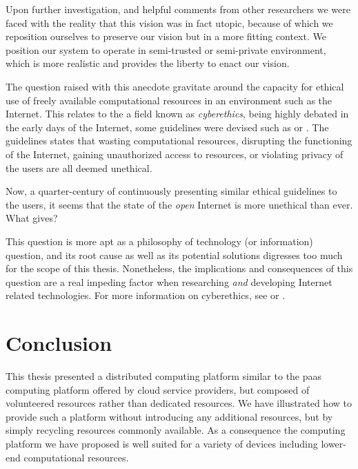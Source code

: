 \documentclass[12pt, titlepage]{uo_temp}
\begin{document}
     Upon further investigation, and helpful comments from other researchers we were faced
     with the reality that this vision was in fact utopic, because of which we reposition
     ourselves to preserve our vision but in a more fitting context. We position
     our system to operate in semi-trusted or semi-private environment, which is more
     realistic and provides the liberty to enact our vision. 
     
     The question raised with this anecdote gravitate around the capacity for ethical use
     of freely available computational resources in an environment such as the
     Internet. This relates to the a field known as \emph{cyberethics}, being highly
     debated in the early days of the Internet, some guidelines were devised such as
     \cite{ethics1989rfc} or \cite{barquin1992pursuit}. The guidelines states that wasting
     computational resources, disrupting the functioning of the Internet, gaining
     unauthorized access to resources, or violating privacy of the users are all deemed
     unethical.

     Now, a quarter-century of continuously presenting similar ethical guidelines to the
     users, it seems that the state of the \emph{open} Internet is more unethical than
     ever. What gives?

     This question is more apt as a philosophy of technology (or information) question,
     and its root cause as well as its potential solutions digresses too much for the scope
     of this thesis. Nonetheless, the implications and consequences of this question are a
     real impeding factor when researching \emph{and} developing Internet related
     technologies. For more information on cyberethics, see \cite{spinello2010cyberethics}
     or \cite{tavani2010ethic}.

     \chapter{Conclusion}
     This thesis presented a distributed computing platform similar to the \gls{paas}
     computing platform offered by cloud service providers, but composed of volunteered
     resources rather than dedicated resources. We have illustrated how to provide such a
     platform without introducing any additional resources, but by simply recycling
     resources commonly available. As a consequence the computing platform we have
     proposed is well suited for a variety of devices including lower-end computational
     resources. 
\end{document}
